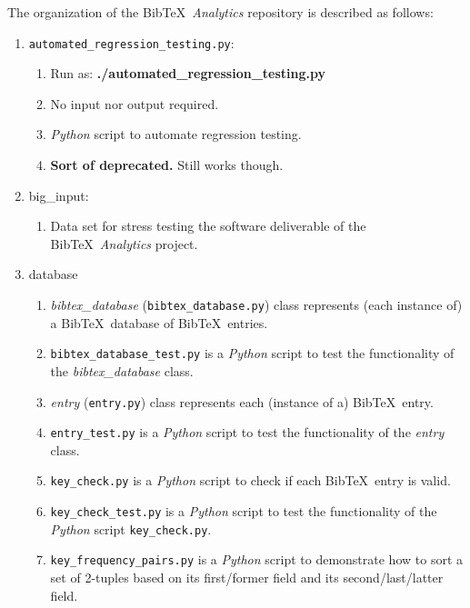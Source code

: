 The organization of the {\sc Bib}\TeX\ {\it Analytics} repository is described as follows: \vspace{-0.3cm}
\begin{enumerate} \itemsep -4pt
\item {\tt automated\_regression\_testing.py}: \vspace{-0.3cm}
	\begin{enumerate} \itemsep -2pt
	\item Run as: {\bf ./automated\_regression\_testing.py}
	\item No input nor output required.
	\item {\it Python} script to automate regression testing.
	\item {\bf Sort of deprecated.} Still works though.
	\end{enumerate}
\item big\_input: \vspace{-0.3cm}
	\begin{enumerate} \itemsep -2pt
	\item Data set for stress testing the software deliverable of the {\sc Bib}\TeX\ {\it Analytics} project.
	\end{enumerate}
\item database \vspace{-0.3cm}
	\begin{enumerate} \itemsep -2pt
	\item {\it bibtex\_database} ({\tt bibtex\_database.py}) class represents (each instance of) a {\sc Bib}\TeX\ database of {\sc Bib}\TeX\ entries.
	\item {\tt bibtex\_database\_test.py} is a {\it Python} script to test the functionality of the {\it bibtex\_database} class.
	\item {\it entry} ({\tt entry.py}) class represents each (instance of a) {\sc Bib}\TeX\ entry.
	\item {\tt entry\_test.py} is a {\it Python} script to test the functionality of the {\it entry} class.
	\item {\tt key\_check.py} is a {\it Python} script to check if each {\sc Bib}\TeX\ entry is valid.
	\item {\tt key\_check\_test.py} is a {\it Python} script to test the functionality of the {\it Python} script {\tt key\_check.py}.
	\item {\tt key\_frequency\_pairs.py} is a {\it Python} script to demonstrate how to sort a set of 2-tuples based on its first/former field and its second/last/latter field.
	\end{enumerate}

\end{enumerate}
